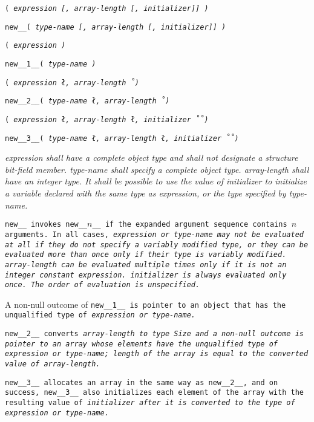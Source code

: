 
\s\s\s\s\tt{(} \it{expression}
[\tt{,} \it{array-length}
[\tt{,} \it{initializer}]] \tt{)}

 \tt{new__}\s\s\s\s\tt{(} \it{type-name}
[\tt{,} \it{array-length}
[\tt{,} \it{initializer}]] \tt{)}

\s\tt{(} \it{expression} \tt{)}

 \tt{new__1__}\s\tt{(} \it{type-name}  \tt{)}

\s\tt{(} \it{expression}
\l\tt{,} \it{array-length}\r\  \tt{)}

 \tt{new__2__}\s\tt{(} \it{type-name}
\l\tt{,} \it{array-length}\r\  \tt{)}

\s\tt{(} \it{expression}
\l\tt{,} \it{array-length}
\l\tt{,} \it{initializer}\r\r\ \tt{)}

 \tt{new__3__}\s\tt{(} \it{type-name}
\l\tt{,} \it{array-length}
\l\tt{,} \it{initializer}\r\r\ \tt{)}


\it{expression} shall have a complete object type
and shall not designate a structure bit-field member.
\it{type-name}  shall specify a complete object type.
\it{array-length} shall have an integer type.
It shall be possible to use the value of \it{initializer} to
initialize a variable declared with the same type as \it{expression},
or the type specified by \it{type-name}.


\tt{new__} invokes \tt{new__}$n$\_\_ if the
expanded argument sequence contains $n$ arguments.
In all cases, \it{expression} or \it{type-name} may not be evaluated
at all if they do not specify a variably modified type, or they can
be evaluated more than once only if their type is variably modified.
\it{array-length} can be evaluated multiple times
only if it is not an integer constant expression.
\it{initializer} is always evaluated only once.
The order of evaluation is unspecified.

A non-null outcome of \tt{new__1__} is pointer to an object
that has the unqualified type of \it{expression} or \it{type-name}.

\tt{new__2__} converts \it{array-length} to type \tt{Size}
and a non-null outcome is pointer to an array whose elements
have the unqualified type of \it{expression} or \it{type-name};
length of the array is equal to the converted value of \it{array-length}.

\tt{new__3__} allocates an array in the same way as \tt{new__2__},
and on success, \tt{new__3__} also initializes each element of
the array with the resulting value of \it{initializer} after it
is converted to the type of \it{expression} or \it{type-name}.

